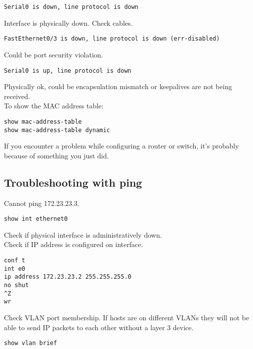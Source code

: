 \begin{verbatim}
Serial0 is down, line protocol is down
\end{verbatim}

Interface is physically down. Check cables.

\begin{verbatim}
FastEthernet0/3 is down, line protocol is down (err-disabled)
\end{verbatim}

Could be port security violation.

\begin{verbatim}
Serial0 is up, line protocol is down
\end{verbatim}

Physically ok, could be encapsulation mismatch or keepalives are not
being received.\\

To show the MAC address table:

\begin{verbatim}
show mac-address-table
show mac-address-table dynamic
\end{verbatim}

If you encounter a problem while configuring a router or switch, it's probably
because of something you just did.

\subsection{Troubleshooting with ping}

Cannot ping 172.23.23.3.

\begin{verbatim}
show int ethernet0  
\end{verbatim}

Check if physical interface is administratively down.\\

Check if IP address is configured on interface.

\begin{verbatim}
conf t
int e0
ip address 172.23.23.2 255.255.255.0
no shut
^Z
wr
\end{verbatim}

Check VLAN port membership. If hosts are on different VLANs they will not be
able to send IP packets to each other without a layer 3 device.

\begin{verbatim}
show vlan brief
\end{verbatim}

